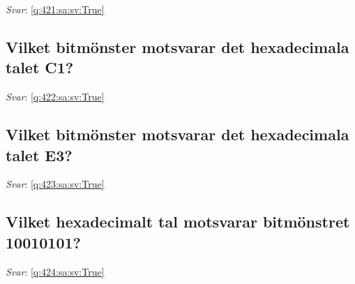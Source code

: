 \documentclass[a4paper,11pt,oneside]{article}
\begin{document}
\begin{sloppypar}
\label{q:421:sa:sv:False}

\vspace{2cm}

\noindent\makebox[\textwidth]{\hrulefill}

\vspace{1cm}

\textit{Svar}: \autoref{q:421:sa:sv:True}



\subsection{Vilket bitm\"onster motsvarar det hexadecimala talet C1?}

\label{q:422:sa:sv:False}

\vspace{2cm}

\noindent\makebox[\textwidth]{\hrulefill}

\vspace{1cm}

\textit{Svar}: \autoref{q:422:sa:sv:True}



\subsection{Vilket bitm\"onster motsvarar det hexadecimala talet E3?}

\label{q:423:sa:sv:False}

\vspace{2cm}

\noindent\makebox[\textwidth]{\hrulefill}

\vspace{1cm}

\textit{Svar}: \autoref{q:423:sa:sv:True}



\subsection{Vilket hexadecimalt tal motsvarar bitm\"onstret 10010101?}

\label{q:424:sa:sv:False}

\vspace{2cm}

\noindent\makebox[\textwidth]{\hrulefill}

\vspace{1cm}

\textit{Svar}: \autoref{q:424:sa:sv:True}




\end{sloppypar}
\end{document}
